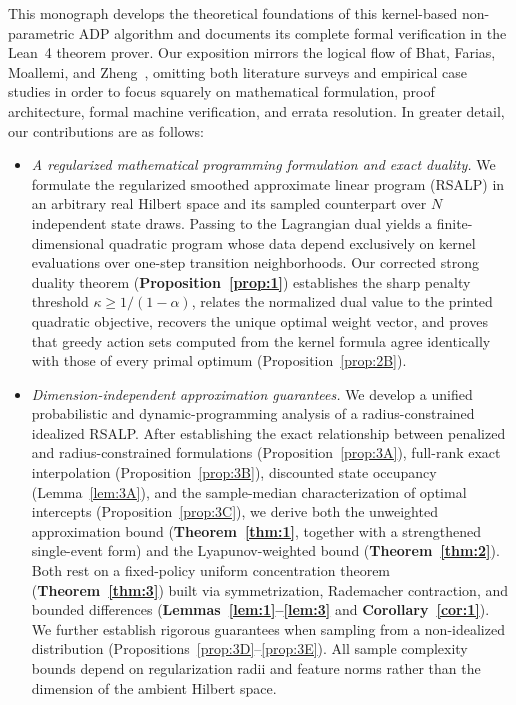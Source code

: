 \documentclass[11pt,letterpaper]{article}
\theoremstyle{definition}
\begin{document}
This monograph develops the theoretical foundations of this kernel-based non-parametric ADP algorithm and documents its complete formal verification in the Lean~4 theorem prover. Our exposition mirrors the logical flow of Bhat, Farias, Moallemi, and Zheng~\cite{BFMZ22}, omitting both literature surveys and empirical case studies in order to focus squarely on mathematical formulation, proof architecture, formal machine verification, and errata resolution. In greater detail, our contributions are as follows:
\begin{itemize}[leftmargin=2em,itemsep=3pt]
  \item \emph{A regularized mathematical programming formulation and exact duality.} We formulate the regularized smoothed approximate linear program (RSALP) in an arbitrary real Hilbert space and its sampled counterpart over $N$ independent state draws. Passing to the Lagrangian dual yields a finite-dimensional quadratic program whose data depend exclusively on kernel evaluations over one-step transition neighborhoods. Our corrected strong duality theorem (\textbf{Proposition~\ref{prop:1}}) establishes the sharp penalty threshold $\kappa \ge 1/(1-\alpha)$, relates the normalized dual value to the printed quadratic objective, recovers the unique optimal weight vector, and proves that greedy action sets computed from the kernel formula agree identically with those of every primal optimum (Proposition~\ref{prop:2B}).

  \item \emph{Dimension-independent approximation guarantees.} We develop a unified probabilistic and dynamic-programming analysis of a radius-constrained idealized RSALP. After establishing the exact relationship between penalized and radius-constrained formulations (Proposition~\ref{prop:3A}), full-rank exact interpolation (Proposition~\ref{prop:3B}), discounted state occupancy (Lemma~\ref{lem:3A}), and the sample-median characterization of optimal intercepts (Proposition~\ref{prop:3C}), we derive both the unweighted approximation bound (\textbf{Theorem~\ref{thm:1}}, together with a strengthened single-event form) and the Lyapunov-weighted bound (\textbf{Theorem~\ref{thm:2}}). Both rest on a fixed-policy uniform concentration theorem (\textbf{Theorem~\ref{thm:3}}) built via symmetrization, Rademacher contraction, and bounded differences (\textbf{Lemmas~\ref{lem:1}--\ref{lem:3}} and \textbf{Corollary~\ref{cor:1}}). We further establish rigorous guarantees when sampling from a non-idealized distribution (Propositions~\ref{prop:3D}--\ref{prop:3E}). All sample complexity bounds depend on regularization radii and feature norms rather than the dimension of the ambient Hilbert space.


\end{itemize}
\end{document}
